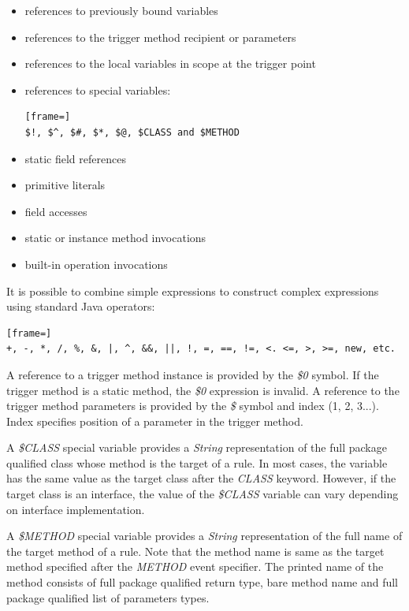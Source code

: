 \documentclass[12pt,oneside]{fithesis2}
\begin{document}
\begin{itemize}
	\item references to previously bound variables
	\item references to the trigger method recipient or parameters
	\item references to the local variables in scope at the trigger point
	\item references to special variables:
\begin{lstlisting}[frame=]
$!, $^, $#, $*, $@, $CLASS and $METHOD
\end{lstlisting}
	\item static field references
	\item primitive literals
	\item field accesses
	\item static or instance method invocations
	\item built-in operation invocations
\end{itemize}

It is possible to combine simple expressions to construct complex expressions using standard Java operators:
\begin{lstlisting}[frame=]
+, -, *, /, %, &, |, ^, &&, ||, !, =, ==, !=, <. <=, >, >=, new, etc.
\end{lstlisting}

A reference to a trigger method instance is provided by the \textit{\$0} symbol. If the trigger method is a static method, the \textit{\$0} expression is invalid. A reference to the trigger method parameters is provided by the \textit{\$} symbol and index (1, 2, 3...). Index specifies position of a parameter in the trigger method.

A \textit{\$CLASS} special variable provides a \textit{String} representation of the full package qualified class whose method is the target of a rule. In most cases, the variable has the same value as the target class after the \textit{CLASS} keyword. However, if the target class is an interface, the value of the \textit{\$CLASS} variable can vary depending on interface implementation.

A \textit{\$METHOD} special variable provides a \textit{String} representation of the full name of the target method of a rule. Note that the method name is same as the target method specified after the \textit{METHOD} event specifier. The printed name of the method consists of full package qualified return type, bare method name and full package qualified list of parameters types.
\end{document}
